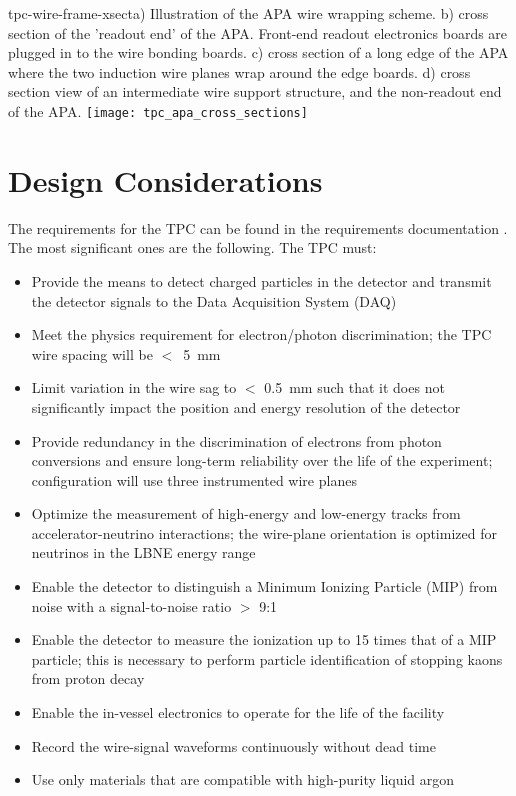 \begin{cdrfigure}{tpc-wire-frame-xsect}{a) Illustration of the APA wire wrapping scheme. b) cross section of the 'readout end' of the APA.  Front-end readout electronics boards are plugged in to the wire bonding boards.  c) cross section of a long edge of the APA where the two induction wire planes wrap around the edge boards.  d) cross section view of an intermediate wire support structure, and the non-readout end of the APA.}
\texttt{[image: tpc\_apa\_cross\_sections]}
\end{cdrfigure}


\section{Design Considerations} 
\label{sec:v5-tpc-reqs-n-specs}

The requirements for the TPC can be found in the requirements documentation \cite{lar-fd-req}. The most significant ones are the following. The TPC must:

\begin{itemize}	
\item Provide the means to detect charged particles in the detector and transmit the detector signals to the Data Acquisition System (DAQ)
\item Meet the physics requirement for electron/photon discrimination;  the TPC wire spacing will be $<$~5~mm
\item Limit variation in the wire sag to $<$ 0.5~mm such that it does not significantly impact the position and energy resolution of the detector
\item Provide redundancy in the discrimination of electrons from photon conversions and ensure long-term reliability over the life of the experiment;  configuration will use three instrumented wire planes
\item Optimize the measurement of high-energy and low-energy tracks from accelerator-neutrino interactions; the wire-plane orientation is optimized for neutrinos in the LBNE energy range
\item Enable the detector to distinguish a Minimum Ionizing Particle (MIP) from noise with a signal-to-noise ratio $>$ 9:1
\item Enable the detector to measure the ionization up to 15 times that of a MIP particle; this is necessary to perform particle identification of stopping kaons from proton decay
\item Enable the in-vessel electronics to operate for the life of the facility
\item Record the wire-signal waveforms continuously without dead time
\item Use only materials that are compatible with high-purity liquid argon

\end{itemize}

